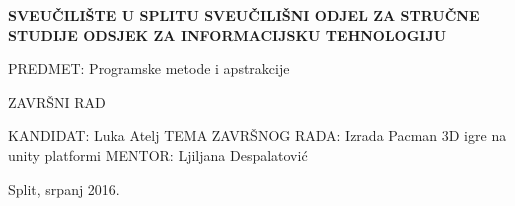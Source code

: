\begin{titlepage}
\bfseries
\headerdata
{SVEUČILIŠTE U SPLITU}
{SVEUČILIŠNI ODJEL ZA STRUČNE STUDIJE}
{ODSJEK ZA INFORMACIJSKU TEHNOLOGIJU}

\vspace*{5cm}
\begin{flushleft}
{\Large   PREDMET: Programske metode i apstrakcije}
\end{flushleft}
\vspace*{3cm}
\begin{center}
{\Large  ZAVRŠNI RAD}
\end{center}
\vspace*{2cm}

\thesisdata
{KANDIDAT: Luka Atelj}  
{TEMA ZAVRŠNOG RADA: Izrada Pacman 3D igre na unity platformi}
{MENTOR: Ljiljana Despalatović}

\begin{center}
\vfill
{\large Split, srpanj 2016.}
\end{center}
\end{titlepage}
